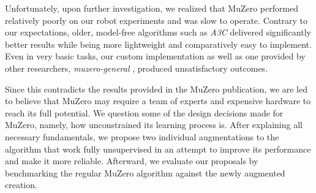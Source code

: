 Unfortunately, upon further investigation, we realized that MuZero performed relatively poorly on our robot experiments and was slow to operate. Contrary to our expectations, older, model-free algorithms such as \textit{A3C} \cite{a3c} delivered significantly better results while being more lightweight and comparatively easy to implement. Even in very basic tasks, our custom implementation as well as one provided by other researchers, \textit{muzero-general} \cite{muzero-general}, produced unsatisfactory outcomes.

Since this contradicts the results provided in the MuZero publication, we are led to believe that MuZero may require a team of experts and expensive hardware to reach its full potential. We question some of the design decisions made for MuZero, namely, how unconstrained its learning process is. After explaining all necessary fundamentals, we propose two individual augmentations to the algorithm that work fully unsupervised in an attempt to improve its performance and make it more reliable. Afterward, we evaluate our proposals by benchmarking the regular MuZero algorithm against the newly augmented creation.